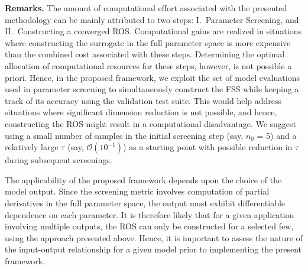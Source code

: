 \textbf{Remarks.}
The amount of computational effort associated with the presented methodology
can be mainly attributed to two steps: I.~Parameter Screening, and 
II.~Constructing a converged ROS. Computational gains are realized in situations
where constructing the surrogate in the full parameter space is more expensive
than the combined cost associated with these steps. Determining the optimal
allocation of computational resources for these steps, however, is not possible
a priori. Hence, in the proposed framework, we exploit the set of model
evaluations used in parameter screening to simultaneously construct the FSS
while keeping a track of its accuracy using the validation test suite. This
would help address situations where significant dimension reduction is not
possible, and hence, constructing the ROS might result in a computational
disadvantage. We suggest using a small number of samples in the initial
screening step (say, $n_0$ = 5) and a relatively large $\tau$ (say,
$\mathcal{O}(10^{-1})$) as a starting point with possible reduction in $\tau$
during subsequent screenings. 


The applicability of the proposed framework depends upon the choice of the
model output.  Since the screening metric involves computation of partial
derivatives in the full parameter space, the output must exhibit differentiable
dependence on each parameter. It is therefore likely that for a given
application involving multiple outputs, the ROS can only be constructed for a
selected few, using the approach presented above.  Hence, it is important to
assess the nature of the input-output relationship for a given model prior to
implementing the present framework. 



